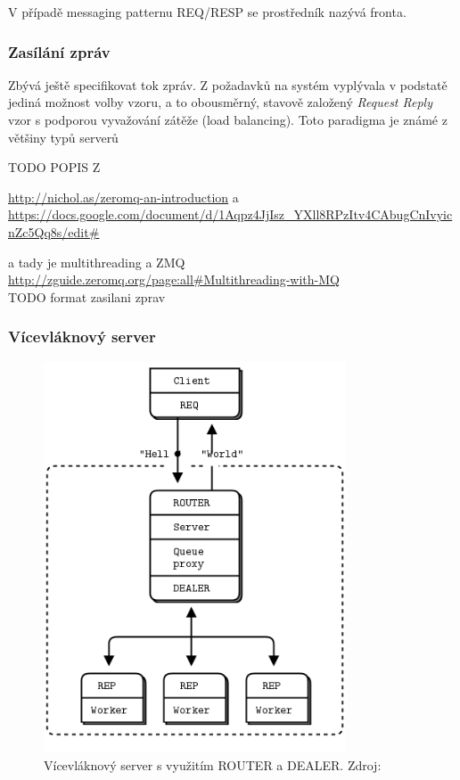 \documentclass[thesis=M,czech]{FITthesis}[2014/05/07]
\begin{document}
V případě messaging patternu REQ/RESP se prostředník nazývá fronta.

\subsubsection{Zasílání zpráv}
Zbývá ještě specifikovat tok zpráv. Z požadavků na systém vyplývala v podstatě jediná možnost volby vzoru, a to obousměrný, stavově založený \emph{Request Reply} vzor s podporou vyvažování zátěže (load balancing). Toto paradigma je známé z většiny typů serverů

TODO POPIS Z 

\url{http://nichol.as/zeromq-an-introduction}
a
\url{https://docs.google.com/document/d/1Aqpz4JjIsz_YXll8RPzItv4CAbugCnIvyicnZc5Qq8s/edit#}

a tady je multithreading a ZMQ
\url{http://zguide.zeromq.org/page:all#Multithreading-with-MQ}
\\

TODO format zasilani zprav

\subsubsection{Vícevláknový server}
\begin{figure}\centering
	\includegraphics[width=0.8\textwidth]{obr/multithreadingServer.png}
 	\caption[Vícevláknový server s využitím ROUTER a DEALER.]{Vícevláknový server s využitím ROUTER a DEALER. Zdroj: \cite{mtserver}}\label{fig:mtserver}
\end{figure}	
\end{document}
